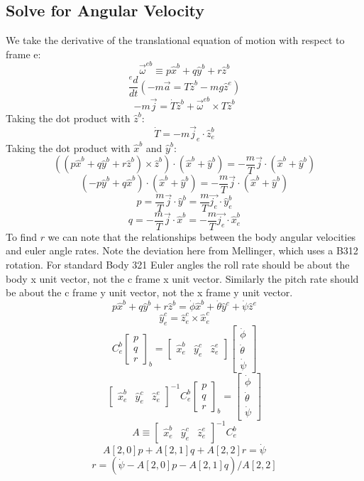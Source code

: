 \documentclass[10pt]{book}
\begin{document}
\subsection{Solve for Angular Velocity}
%
We take the derivative of the translational equation of motion with respect to frame e:
%
$$ \vec{\omega}^{eb} \equiv p \hat{x}^b + q \hat{y}^b + r \hat{z}^b$$
%
$$\dfrac{^ed}{dt}\left(-m\vec{a} = T \hat{z}^b - m g \hat{z}^e\right)$$
%
$$-m\vec{j} = \dot{T} \hat{z}^b + \vec{\omega}^{eb} \times T \hat{z}^b$$
%
Taking the dot product with $\hat{z}^b$:
%
$$\dot{T}= - m\vec{j}_e \cdot \hat{z}^b_e$$
%
Taking the dot product with $\hat{x}^b$ and $\hat{y}^b$:
%
$$\left((p \hat{x}^b + q \hat{y}^b + r \hat{z}^b) \times \hat{z}^b\right) \cdot (\hat{x}^b + \hat{y}^b)  = - \dfrac{m}{T}\vec{j} \cdot (\hat{x}^b + \hat{y}^b)$$
%
$$(-p \hat{y}^b + q \hat{x}^b) \cdot (\hat{x}^b + \hat{y}^b)  = - \dfrac{m}{T}\vec{j} \cdot (\hat{x}^b + \hat{y}^b)$$
%
$$p  =  \dfrac{m}{T}\vec{j} \cdot \hat{y}^b = \dfrac{m}{T}\vec{j_e} \cdot \hat{y}^b_e$$
%
$$q  =  -\dfrac{m}{T}\vec{j} \cdot \hat{x}^b = -\dfrac{m}{T}\vec{j_e} \cdot \hat{x}^b_e$$
%
To find $r$ we can note that the relationships between the body angular velocities and euler angle rates. Note the deviation here from Mellinger, which uses a B312 rotation. For standard Body 321 Euler angles the roll rate should be about the body x unit vector, not the c frame x unit vector. Similarly the pitch rate should be about the c frame y unit vector, not the x frame y unit vector.
%
$$p \hat{x}^b + q \hat{y}^b +  r \hat{z}^b = \dot{\phi} \hat{x}^b + \dot{\theta} \hat{y}^c + \dot{\psi} \hat{z}^e$$
%
$$\hat{y}^c_e = \hat{z}^c_e \times \hat{x}^c_e$$
%
$$C^b_e \begin{bmatrix} p \\ q \\ r \end{bmatrix}_b = \begin{bmatrix} \hat{x}^b_e & \hat{y}^c_e & \hat{z}^e_e\end{bmatrix} \begin{bmatrix} \dot{\phi} \\ \dot{\theta} \\ \dot{\psi} \end{bmatrix}$$
%
$$\begin{bmatrix} \hat{x}^b_e & \hat{y}^c_e & \hat{z}^e_e\end{bmatrix}^{-1} C^b_e \begin{bmatrix} p \\ q \\ r \end{bmatrix}_b =  \begin{bmatrix} \dot{\phi} \\ \dot{\theta} \\ \dot{\psi} \end{bmatrix}$$
%
%
$$A \equiv \begin{bmatrix} \hat{x}^b_e & \hat{y}^c_e & \hat{z}^e_e\end{bmatrix}^{-1} C^b_e $$
%
$$A[2, 0] p +  A[2, 1] q + A[2, 2] r = \dot{\psi}$$
%
$$r = (\dot{\psi} - A[2, 0] p -  A[2, 1] q)/A[2, 2]$$
\end{document}
